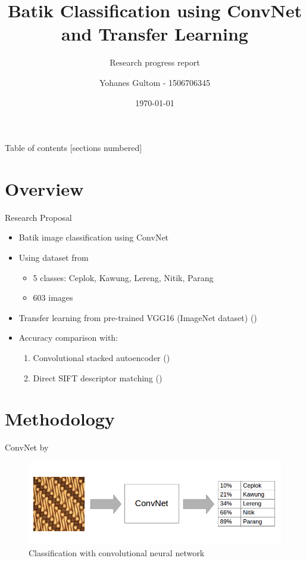 \documentclass[10pt]{beamer}
\title{Batik Classification using ConvNet and Transfer Learning}
\subtitle{Research progress report}
\date{\today}
\author{Yohanes Gultom - 1506706345}
\institute{IKO61181 Advance Image Processing}
\begin{document}
\maketitle

\begin{frame}{Table of contents}
  [sections numbered]
  \tableofcontents[hideallsubsections]
\end{frame}

\section{Overview}

\begin{frame}{Research Proposal}

	\begin{itemize}[<+->]
		\item Batik image classification using ConvNet \cite{lecun2015deep}
		\item Using dataset from \cite{menzata2014sistem}
		\begin{itemize}
			\item 5 classes: Ceplok, Kawung, Lereng, Nitik, Parang
			\item 603 images			
		\end{itemize}
		\item Transfer learning from pre-trained VGG16 (ImageNet dataset) (\cite{simonyan2014very})
		\item Accuracy comparison with:
		\begin{enumerate}
			\item Convolutional stacked autoencoder (\cite{menzata2014sistem})
			\item Direct SIFT descriptor matching (\cite{willy2013evaluation})
		\end{enumerate}
	\end{itemize}

\end{frame}

\section{Methodology}

\begin{frame}{ConvNet by \cite{lecun2015deep}}

	\begin{figure}
		\centering
		\includegraphics[width=1.0\linewidth]{convnet-batik}
		\caption{Classification with convolutional neural network}
		\label{fig_convnet_classification}
    \end{figure}

\end{frame}
\end{document}
